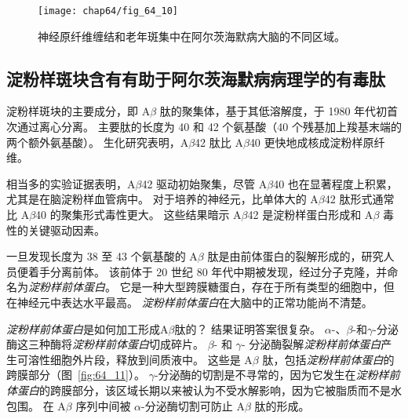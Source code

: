 \begin{figure}[htbp]
	\centering
	\texttt{[image: chap64/fig\_64\_10]}
	\caption{神经原纤维缠结和老年斑集中在阿尔茨海默病大脑的不同区域\cite{arnold1991topographical}。}
	\label{fig:64_10}
\end{figure}



\subsection{淀粉样斑块含有有助于阿尔茨海默病病理学的有毒肽}

淀粉样斑块的主要成分，即 A$\beta$ 肽的聚集体，基于其低溶解度，于 1980 年代初首次通过离心分离。
主要肽的长度为 40 和 42 个氨基酸（40 个残基加上羧基末端的两个额外氨基酸）。
生化研究表明，A$\beta$42 肽比 A$\beta$40 更快地成核成淀粉样原纤维。


相当多的实验证据表明，A$\beta$42 驱动初始聚集，尽管 A$\beta$40 也在显著程度上积累，尤其是在脑淀粉样血管病中。
对于培养的神经元，比单体大的 A$\beta$42 肽形式通常比 A$\beta$40 的聚集形式毒性更大。
这些结果暗示 A$\beta$42 是淀粉样蛋白形成和 A$\beta$ 毒性的关键驱动因素。


一旦发现长度为 38 至 43 个氨基酸的 A$\beta$ 肽是由前体蛋白的裂解形成的，研究人员便着手分离前体。
该前体于 20 世纪 80 年代中期被发现，经过分子克隆，并命名为\textit{淀粉样前体蛋白}。
它是一种大型跨膜糖蛋白，存在于所有类型的细胞中，但在神经元中表达水平最高。
\textit{淀粉样前体蛋白}在大脑中的正常功能尚不清楚。


\textit{淀粉样前体蛋白}是如何加工形成A$\beta$肽的？
结果证明答案很复杂。
$\alpha$-、$\beta$-和$\gamma$-分泌酶这三种酶将\textit{淀粉样前体蛋白}切成碎片。
$\beta$- 和 $\gamma$- 分泌酶裂解\textit{淀粉样前体蛋白}产生可溶性细胞外片段，释放到间质液中。
这些是 A$\beta$ 肽，包括\textit{淀粉样前体蛋白}的跨膜部分（图~\ref{fig:64_11}）。
$\gamma$-分泌酶的切割是不寻常的，因为它发生在\textit{淀粉样前体蛋白}的跨膜部分，该区域长期以来被认为不受水解影响，因为它被脂质而不是水包围。
在 A$\beta$ 序列中间被 $\alpha$-分泌酶切割可防止 A$\beta$ 肽的形成。


